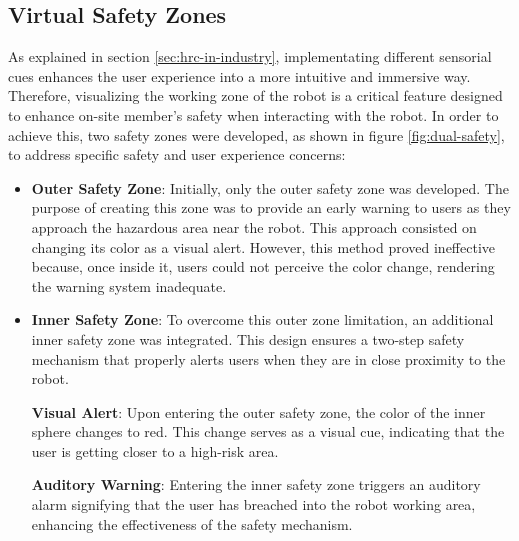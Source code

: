     
\subsection{Virtual Safety Zones}
\label{subsection:virtual-safety-zones} 

As explained in section \ref{sec:hrc-in-industry}, implementating different sensorial cues enhances the user experience into a more intuitive and immersive way. Therefore, visualizing the working zone of the robot is a critical feature designed to enhance on-site member's safety when interacting with the robot. In order to achieve this, two safety zones were developed, as shown in figure \ref{fig:dual-safety}, to address specific safety and user experience concerns: 

\begin{itemize}
\item \textbf{Outer Safety Zone}: Initially, only the outer safety zone was developed. The purpose of creating this zone was to provide an 
early warning to users as they approach the hazardous area near the robot. This approach consisted on changing its color as a visual alert. 
However, this method proved ineffective because, once inside it, users could not perceive the color change, rendering the warning system inadequate.

\item \textbf{Inner Safety Zone}: To overcome this outer zone limitation, an additional inner safety zone was integrated. This design ensures a two-step safety mechanism that properly alerts users when they are in close proximity to the robot.

    \textbf{Visual Alert}: Upon entering the outer safety zone, the color of the inner sphere changes to red. This change serves as a visual cue, indicating that the user is getting closer to a high-risk area.

    \textbf{Auditory Warning}: Entering the inner safety zone triggers an auditory alarm signifying that the user has breached into the robot working area, enhancing the effectiveness of the safety mechanism.
\end{itemize}

